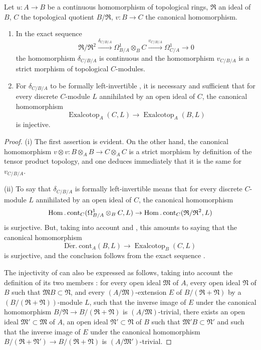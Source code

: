 \begin{proposition}[20.7.8]
\label{0.20.7.8}
Let $u:A\to B$ be a continuous homomorphism of topological rings, $\mathfrak{R}$ an ideal of $B$, $C$ the topological quotient $B/\mathfrak{R}$, $v:B\to C$ the canonical homomorphism.
\begin{enumerate}
  \item[\rm(i)] In the exact sequence 
\[
  \mathfrak{R}/\mathfrak{R}^2\xrightarrow{\delta_{C/B/A}}\Omega^1_{B/A}\otimes_B C\xrightarrow{v_{C/B/A}}\Omega^1_{C/A}\to 0
\]
the homomorphism $\delta_{C/B/A}$ is continuous and the homomorphism $v_{C/B/A}$ is a strict morphism of topological $C$-modules.
  \item[\rm(ii)] For $\delta_{C/B/A}$ to be formally left-invertible , it is necessary and sufficient that for every discrete $C$-module $L$ annihilated by an open ideal of $C$, the canonical homomorphism
\begin{equation}
\tag{20.7.8.1}
  \label{0.20.7.8.1}
  \operatorname{Exalcotop}_A(C,L)\to\operatorname{Exalcotop}_A(B,L)
\end{equation}
is injective.
\end{enumerate}
\end{proposition}

\begin{proof}
(i) The first assertion is evident.
On the other hand, the canonical homomorphism $v\otimes v:B\otimes_A B\to C\otimes_A C$ is a strict morphism by definition of the tensor product topology, and one deduces immediately that it is the same for $v_{C/B/A}$.

(ii) To say that $\delta_{C/B/A}$ is formally left-invertible means that for every discrete $C$-module $L$ annihilated by an open ideal of $C$, the canonical homomorphism
\[
  \operatorname{Hom}.\operatorname{cont}_C(\Omega^1_{B/A}\otimes_B C,L)\to\operatorname{Hom}.\operatorname{cont}_C(\mathfrak{R}/\mathfrak{R}^2,L)
\]
is surjective.
But, taking into account  and , this amounts to saying that the canonical homomorphism
\[
  \operatorname{D\acute{e}r.\ cont}_A(B,L)\to\operatorname{Exalcotop}_B(C,L)
\]
is surjective, and the conclusion follows from the exact sequence .

The injectivity of  can also be expressed as follows, taking into account the definition of its two members : for every open ideal $\mathfrak{M}$ of $A$, every open ideal $\mathfrak{N}$ of $B$ such that $\mathfrak{M}B\subset\mathfrak{N}$, and every $(A/\mathfrak{M})$-extension $E$ of $B/(\mathfrak{R}+\mathfrak{N})$ by a $(B/(\mathfrak{R}+\mathfrak{N}))$-module $L$, such that the inverse image of $E$ under the canonical homomorphism $B/\mathfrak{N}\to B/(\mathfrak{R}+\mathfrak{N})$ is $(A/\mathfrak{M})$-trivial, there exists an open ideal $\mathfrak{M}'\subset\mathfrak{M}$ of $A$,
an open ideal $\mathfrak{N}'\subset\mathfrak{N}$ of $B$ such that $\mathfrak{M}'B\subset\mathfrak{N}'$ and such that the inverse image of $E$ under the canonical homomorphism $B/(\mathfrak{R}+\mathfrak{N}')\to B/(\mathfrak{R}+\mathfrak{N})$ is $(A/\mathfrak{M}')$-trivial.
\end{proof}

